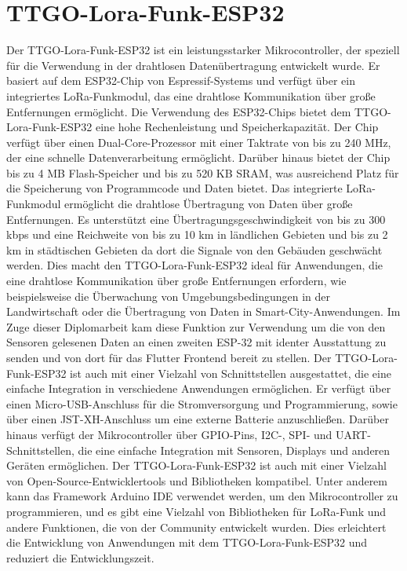 \section{TTGO-Lora-Funk-ESP32 }
Der TTGO-Lora-Funk-ESP32 ist ein leistungsstarker Mikrocontroller, der speziell für die Verwendung in der drahtlosen Datenübertragung entwickelt wurde. 
Er basiert auf dem ESP32-Chip von Espressif-Systems und verfügt über ein integriertes LoRa-Funkmodul, das eine drahtlose Kommunikation über große Entfernungen ermöglicht.
Die Verwendung des ESP32-Chips bietet dem TTGO-Lora-Funk-ESP32 eine hohe Rechenleistung und Speicherkapazität. 
Der Chip verfügt über einen Dual-Core-Prozessor mit einer Taktrate von bis zu 240 MHz, der eine schnelle Datenverarbeitung ermöglicht. 
Darüber hinaus bietet der Chip bis zu 4 MB Flash-Speicher und bis zu 520 KB SRAM, was ausreichend Platz für die Speicherung von Programmcode und Daten bietet.
Das integrierte LoRa-Funkmodul ermöglicht die drahtlose Übertragung von Daten über große Entfernungen. Es unterstützt eine Übertragungsgeschwindigkeit von bis zu 300 kbps und eine Reichweite von bis zu 10 km in ländlichen Gebieten und bis zu 2 km in städtischen Gebieten da dort die Signale von den Gebäuden geschwächt werden. Dies macht den TTGO-Lora-Funk-ESP32 ideal für Anwendungen, die eine drahtlose Kommunikation über große Entfernungen erfordern, wie beispielsweise die Überwachung von Umgebungsbedingungen in der Landwirtschaft oder die Übertragung von Daten in Smart-City-Anwendungen. Im Zuge dieser Diplomarbeit kam diese Funktion zur Verwendung um die von den Sensoren gelesenen Daten an einen zweiten ESP-32 mit identer Ausstattung zu senden und von dort für das Flutter Frontend bereit zu stellen. 
Der TTGO-Lora-Funk-ESP32 ist auch mit einer Vielzahl von Schnittstellen ausgestattet, die eine einfache Integration in verschiedene Anwendungen ermöglichen. Er verfügt über einen Micro-USB-Anschluss für die Stromversorgung und Programmierung, sowie über einen JST-XH-Anschluss um eine externe Batterie anzuschließen. Darüber hinaus verfügt der Mikrocontroller über GPIO-Pins, I2C-, SPI- und UART-Schnittstellen, die eine einfache Integration mit Sensoren, Displays und anderen Geräten ermöglichen.
Der TTGO-Lora-Funk-ESP32 ist auch mit einer Vielzahl von Open-Source-Entwicklertools und Bibliotheken kompatibel.  Unter anderem kann das Framework Arduino IDE verwendet werden, um den Mikrocontroller zu programmieren, und es gibt eine Vielzahl von Bibliotheken für LoRa-Funk und andere Funktionen, die von der Community entwickelt wurden. Dies erleichtert die Entwicklung von Anwendungen mit dem TTGO-Lora-Funk-ESP32 und reduziert die Entwicklungszeit.
